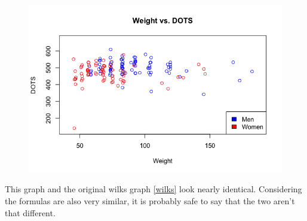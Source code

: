 \documentclass[10pt,letterpaper]{article}
\begin{document}
    \begin{figure}[H]
        \center
        \includegraphics[width=35em]{weightVSdots.png}
        \label{dots}
    \end{figure}
    This graph and the original wilks graph \ref{wilks} look nearly identical. Considering the formulas are also very similar, it is probably safe to say that the two aren't that different. 
\end{document}
